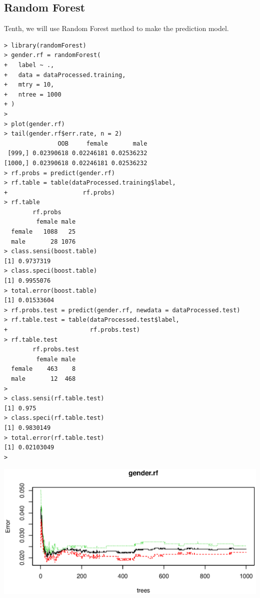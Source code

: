 \documentclass{article}%
\begin{document}
\subsection{Random Forest}
Tenth, we will use Random Forest method to make the prediction model.
\begin{verbatim}> library(randomForest)
> gender.rf = randomForest(
+   label ~ .,
+   data = dataProcessed.training,
+   mtry = 10,
+   ntree = 1000
+ )
>
> plot(gender.rf)
> tail(gender.rf$err.rate, n = 2)
               OOB     female       male
 [999,] 0.02390618 0.02246181 0.02536232
[1000,] 0.02390618 0.02246181 0.02536232
> rf.probs = predict(gender.rf)
> rf.table = table(dataProcessed.training$label,
+                     rf.probs)
> rf.table
        rf.probs
         female male
  female   1088   25
  male       28 1076
> class.sensi(boost.table)
[1] 0.9737319
> class.speci(boost.table)
[1] 0.9955076
> total.error(boost.table)
[1] 0.01533604
> rf.probs.test = predict(gender.rf, newdata = dataProcessed.test)
> rf.table.test = table(dataProcessed.test$label,
+                       rf.probs.test)
> rf.table.test
        rf.probs.test
         female male
  female    463    8
  male       12  468
>
> class.sensi(rf.table.test)
[1] 0.975
> class.speci(rf.table.test)
[1] 0.9830149
> total.error(rf.table.test)
[1] 0.02103049
> \end{verbatim}
\includegraphics[width = \textwidth]{Rplot_random_forest.eps}
\end{document}
